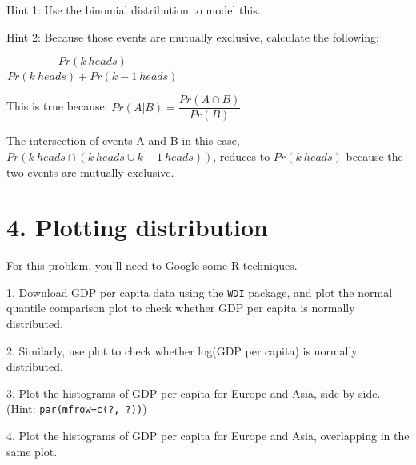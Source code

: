 \documentclass{article}\usepackage[]{graphicx}\usepackage[]{color}
\begin{document}
Hint 1: Use the binomial distribution to model this.

Hint 2: Because those events are mutually exclusive, calculate the following:

$\dfrac{Pr(k\ heads)}{Pr (k\ heads) + Pr (k-1\ heads)}$

This is true because: $Pr(A | B) = \dfrac{Pr (A \cap B)}{Pr (B)}$

The intersection of events A and B in this case, $Pr (k\ heads \cap (k\ heads \cup k-1\ heads))$, reduces to $Pr(k\ heads)$ because the two events are mutually exclusive.

\section*{4. Plotting distribution}

For this problem, you'll need to Google some R techniques.

1. Download GDP per capita data using the \verb`WDI` package, and plot the normal quantile comparison plot to check whether GDP per capita is normally distributed.

2. Similarly, use plot to check whether log(GDP per capita) is normally distributed.

3. Plot the histograms of GDP per capita for Europe and Asia, side by side. (Hint: \verb`par(mfrow=c(?, ?))`)

4. Plot the histograms of GDP per capita for Europe and Asia, overlapping in the same plot.
\end{document}
